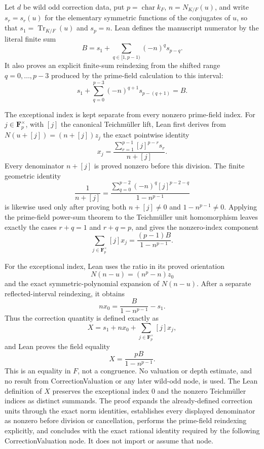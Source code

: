 \begin{theorem}\label{mod:cases-wildodd-correctionformula}
Let $d$ be wild odd correction data, put
$p=\operatorname{char}k_F$, $n=N_{K/F}(u)$, and write
$s_r=s_r(u)$ for the elementary symmetric functions of the conjugates of
$u$, so that $s_1=\operatorname{Tr}_{K/F}(u)$ and $s_p=n$.  Lean defines the
manuscript numerator by the literal finite sum
\[
 B=s_1+\sum_{q\in[1,p-1)}(-n)^q s_{p-q}.
\]
It also proves an explicit finite-sum reindexing from the shifted range
$q=0,\ldots,p-3$ produced by the prime-field calculation to this interval:
\[
 s_1+\sum_{q=0}^{p-3}(-n)^{q+1}s_{p-(q+1)}=B.
\]

The exceptional index is kept separate from every nonzero prime-field
index.  For $j\in\mathbf F_p^\times$, with $[j]$ the canonical
Teichmüller lift, Lean first derives from
$N(u+[j])=(n+[j])z_j$ the exact pointwise identity
\[
 x_j=
 \frac{\sum_{r=1}^{p-1}[j]^{p-r}s_r}{n+[j]}.
\]
Every denominator $n+[j]$ is proved nonzero before this division.  The
finite geometric identity
\[
 \frac1{n+[j]}=
 \frac{\sum_{q=0}^{p-2}(-n)^q[j]^{p-2-q}}
      {1-n^{p-1}}
\]
is likewise used only after proving both $n+[j]\ne0$ and
$1-n^{p-1}\ne0$.  Applying the prime-field power-sum theorem to the
Teichmüller unit homomorphism leaves exactly the cases $r+q=1$ and
$r+q=p$, and gives the nonzero-index component
\[
 \sum_{j\in\mathbf F_p^\times}[j]x_j
   =\frac{(p-1)B}{1-n^{p-1}}.
\]

For the exceptional index, Lean uses the ratio in its proved orientation
\[
 N(n-u)=(n^p-n)z_0
\]
and the exact symmetric-polynomial expansion of $N(n-u)$.  After a
separate reflected-interval reindexing, it obtains
\[
 nx_0=\frac{B}{1-n^{p-1}}-s_1.
\]
Thus the correction quantity is defined exactly as
\[
 X=s_1+nx_0+
   \sum_{j\in\mathbf F_p^\times}[j]x_j,
\]
and Lean proves the field equality
\[
 \boxed{X=\frac{pB}{1-n^{p-1}}}.
\]
This is an equality in $F$, not a congruence.  No valuation or depth
estimate, and no result from CorrectionValuation or any later wild-odd
node, is used.
\leanok
{}
\FormalizationContract The Lean definition of $X$ preserves the exceptional
index $0$ and the nonzero Teichmüller indices as distinct summands.  The
proof expands the already-defined correction units through the exact norm
identities, establishes every displayed denominator as nonzero before
division or cancellation, performs the prime-field reindexing explicitly,
and concludes with the exact rational identity required by the following
CorrectionValuation node.  It does not import or assume that node.
\end{theorem}
